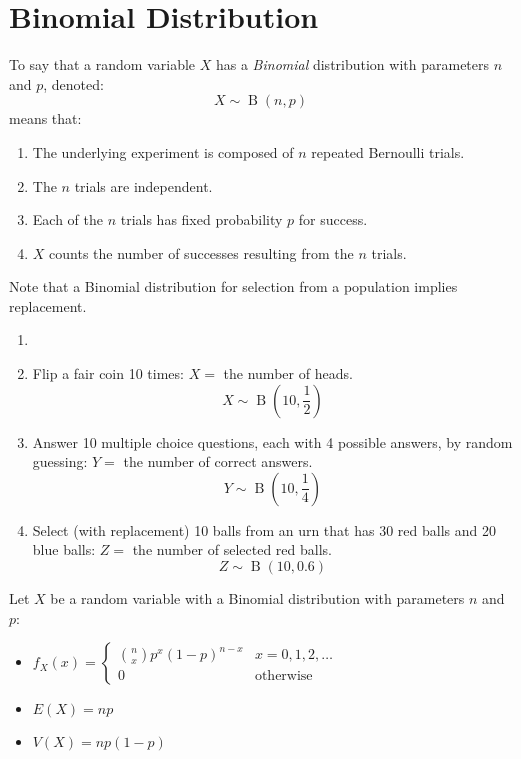 \documentclass[letterpaper,12pt,fleqn]{article}
\DeclareMathOperator{\bin}{B}
\begin{document}
\section*{Binomial Distribution}

\begin{definition}
  To say that a random variable \(X\) has a \emph{Binomial} distribution with parameters \(n\) and \(p\), denoted:
  \[X\sim\bin(n,p)\]
  means that:
  \begin{enumerate}
  \item The underlying experiment is composed of \(n\) repeated Bernoulli trials.
  \item The \(n\) trials are independent.
  \item Each of the \(n\) trials has fixed probability \(p\) for success.
  \item \(X\) counts the number of successes resulting from the \(n\) trials.
  \end{enumerate}
\end{definition}

Note that a Binomial distribution for selection from a population implies replacement.

\begin{examples}
  \begin{enumerate}
  \item[]
  \item Flip a fair coin 10 times: \(X=\) the number of heads.
    \[X\sim\bin\left(10,\frac{1}{2}\right)\]
  \item Answer 10 multiple choice questions, each with 4 possible answers, by random guessing: \(Y=\) the number of correct
    answers.
    \[Y\sim\bin\left(10,\frac{1}{4}\right)\]
  \item Select (with replacement) 10 balls from an urn that has 30 red balls and 20 blue balls: \(Z=\) the number of selected
    red balls.
    \[Z\sim\bin\left(10,0.6\right)\]
  \end{enumerate}
\end{examples}

\begin{theorem}
  Let \(X\) be a random variable with a Binomial distribution with parameters \(n\) and \(p\):
  \begin{itemize}
  \item \(f_X(x)=\begin{cases}
    \binom{n}{x}p^x(1-p)^{n-x} & x=0,1,2,\ldots \\
    0 & \text{otherwise}
  \end{cases}\)
  \item \(E(X)=np\)
  \item \(V(X)=np(1-p)\)
  \end{itemize}
\end{theorem}
\end{document}

